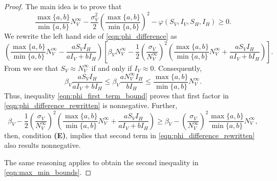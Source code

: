 \begin{proof}
    The main idea is to prove that
    \begin{equation}
        \label{eqn:phi_difference}
        \frac{
            \max\{a,b\}
        }{
            \min \{a, b\}
        }
          N_V ^ {\infty}
        - 
        \frac{\sigma_V ^ 2}{2}
        \left(
            \frac{
                \max\{a,b\}
            }{
                \min \{a, b\}
            }
        \right) ^ 2
        -
        \varphi (S_V, I_V, S_H, I_H)            
        \geq 
        0.
    \end{equation}
    We rewrite the left hand side of \eqref{eqn:phi_difference} as
%
    \begin{equation}
    \label{eqn:phi_difference_rewritten}
        \left(
            \frac{
                \max \{a,b\}
            }{
                \min \{a,b\}
            }
            N_V ^ \infty
%            
            -
            \frac{ a S_V I_H}{a I_V + b I_H}
        \right)
        \left[
            \beta_V N_V ^ {\infty}
            -
            \frac{1}{2}
            \left(
                \frac{\sigma_V}{N_V ^ {\infty}}
            \right) ^2
            \left(
                \frac{
                    \max \{a,b\}
                }{
                    \min \{a,b\}
                }
                N_V ^ {\infty}
                +
                \frac{a S_V I_H}{a I_V + b I_H}
            \right)
        \right].
    \end{equation}
%
    From  we see that
    $S_V \approx N_V ^ \infty$ if and only if $I_V \approx 0$. Consequently,
    \begin{equation}\label{eqn:phi_first_term_bound}
        \beta_V
            \frac{a S_V I_H}{a I_V + b I_H}
        \leq
         \beta_V
            \frac{a N_V ^ \infty I_H}{b I_H}
        \leq
            \frac{
                \max \{ a,b \} 
            }{
                \min\{ a, b\}
            }
             N_V ^ \infty.
    \end{equation}
    Thus, inequality \eqref{eqn:phi_first_term_bound} proves
    that first factor in \eqref{eqn:phi_difference_rewritten} is nonnegative.
    Further, 
    $$
        \beta_V
        -
        \frac{1}{2}
        \left(
            \frac{\sigma_V}{N_V ^ {\infty}}
        \right) ^2
        \left(
            \frac{
                \max \{a,b\}
            }{
                \min \{a,b\}
            }
            N_V ^ \infty
            +
            \frac{a S_V I_H}{a I_V + b I_H}
        \right)
        \geq
        \beta_V
        -
        \left(
            \frac{\sigma_V}{N_V ^ {\infty}}
        \right) ^2
            \frac{
                \max \{a,b\}
            }{
                \min \{a,b\}
            }
            N_V ^ \infty,
    $$
    then, condition \textsc{ \textbf{(E)}}, implies that
    second term in \eqref{eqn:phi_difference_rewritten} also results 
    nonnegative.
    
        The same reasoning applies to obtain the second inequality in 
    \eqref{eqn:max_min_bounds}.
\end{proof}


